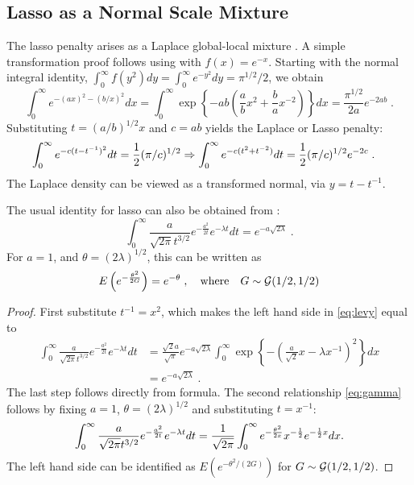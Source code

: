 \documentclass[lineno]{biometrika}
\begin{document}
\subsection{Lasso as a Normal Scale Mixture}
The lasso penalty arises as a Laplace global-local mixture
\citep{andrews_scale_1974}.  A simple transformation proof follows using \CS{}
with $f(x) = e^{-x}$.  Starting with the normal integral identity, 
$\int_{0}^{\infty} f(y^2) dy = \int_0^\infty e^{-y^2} dy = \pi^{1/2}/2 $, we
obtain
$$
\int_0^\infty e^{-(a x)^2 - (b/x)^2} d x 
= \int_0^{\infty} 
\exp\left\{-a b \left(\frac{a}{b} x^2 + \frac{b}{a} x^{-2} \right)\right\} dx 
= \frac{\pi^{1/2}}{2a} e^{-2 a b}
\;.
$$
Substituting $t = (a/b)^{1/2} x$ and $c = ab$ yields the Laplace or Lasso penalty:  
\begin{align*}
  \int_0^\infty e^{- c (t - t^{-1})^2} dt 
  &= \frac{1}{2} (\pi/c)^{1/2} 
  \Rightarrow \int_0^\infty e^{- c (t^2 + t^{-2})} dt 
  = \frac{1}{2} (\pi/c)^{1/2} e^{-2c}
  \;. 
\end{align*}
The Laplace density can be viewed as a transformed normal, via $y = t - t^{-1}$.

\begin{remark}
The usual identity for lasso can also be obtained from \citet{levy1940certains}:
\begin{equation}
  \int_{0}^{\infty} \frac{a}{\sqrt{2 \pi} t^{3/2}} 
  e^{-\frac{a^2}{2 t}} e^{-\lambda t} dt 
  = e^{-a \sqrt{2 \lambda}} 
  \;.
  \label{eq:levy}
\end{equation}
For $a = 1$, and $\theta = (2 \lambda)^{1/2}$, this can be written as 
\begin{equation}
  E\left(e^{-\frac{\theta^2}{2 G}}\right) = e^{-\theta}
  \;, 
  \quad\text{where}\quad 
  G \sim \GammaRV(1/2, 1/2) 
  \label{eq:gamma}
\end{equation}
\end{remark}

\begin{proof}
First substitute $t^{-1} = x^2$, which makes the left hand side in
\eqref{eq:levy} equal to 
\begin{align*}
  \int_{0}^{\infty} \frac{a}{\sqrt{2 \pi} t^{3/2}} e^{-\frac{a^2}{2 t}} e^{-\lambda t} dt 
  &= \frac{\sqrt{2} a}{\sqrt{\pi}} e^{-a \sqrt{2 \lambda}} 
  \int_0^{\infty} \exp\left\{-\left(\frac{a}{\sqrt{2}} x - \lambda x^{-1}\right)^2\right\} dx 
  \\
  &= e^{-a \sqrt{2 \lambda}}
  \;.
\end{align*}
The last step follows directly from \CS{} formula.  The second relationship
\eqref{eq:gamma} follows by fixing $a = 1$, $\theta = (2\lambda)^{1/2}$ and
substituting $t = x^{-1}$: 
$$
\int_{0}^{\infty} \frac{a}{\sqrt{2 \pi} t^{3/2}} 
e^{-\frac{a^2}{2 t}} e^{-\lambda t} dt 
= \frac{1}{\sqrt{2 \pi}} \int_{0}^{\infty} e^{-\frac{\theta^2}{2x}} 
x^{-\frac{1}{2}} e^{-\frac{1}{2} x} dx.
$$
The left hand side can be identified as 
$E\left(e^{-\theta^2 / (2 G) } \right)$ for 
$G \sim \mathcal{G}(1/2, 1/2)$. 
\end{proof}
\end{document}
